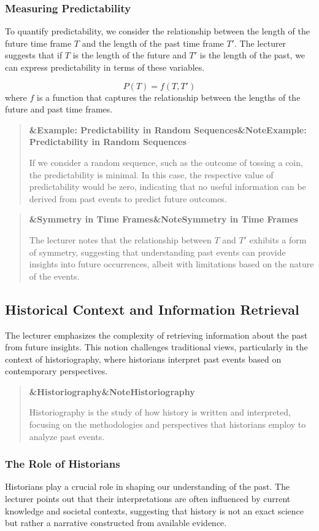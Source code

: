 \documentclass[a4paper]{article}
\newcommand{\boxheading}[1]{%
  \par\smallskip
  \noindent\textbf{\ifx&#1&Note\else#1\fi}\par
  \smallskip
}
\newenvironment{defbox}[1][]{%
  \begin{quote}\color{green!40!black}\boxheading{#1}\normalcolor
}{\end{quote}}
\newenvironment{exbox}[1][]{%
  \begin{quote}\color{brown!70!black}\boxheading{#1}\normalcolor
}{\end{quote}}
\newenvironment{rembox}[1][]{%
  \begin{quote}\color{black!70}\boxheading{#1}\normalcolor
}{\end{quote}}
\begin{document}
\subsubsection{Measuring Predictability}
To quantify predictability, we consider the relationship between the length of the future time frame \( T \) and the length of the past time frame \( T' \). The lecturer suggests that if \( T \) is the length of the future and \( T' \) is the length of the past, we can express predictability in terms of these variables.

\begin{equation}
P(T) = f(T, T')
\end{equation}
where \( f \) is a function that captures the relationship between the lengths of the future and past time frames.

\begin{exbox}[Example: Predictability in Random Sequences]
If we consider a random sequence, such as the outcome of tossing a coin, the predictability is minimal. In this case, the respective value of predictability would be zero, indicating that no useful information can be derived from past events to predict future outcomes.
\end{exbox}

\begin{rembox}[Symmetry in Time Frames]
The lecturer notes that the relationship between \( T \) and \( T' \) exhibits a form of symmetry, suggesting that understanding past events can provide insights into future occurrences, albeit with limitations based on the nature of the events.
\end{rembox}

\subsection{Historical Context and Information Retrieval}
The lecturer emphasizes the complexity of retrieving information about the past from future insights. This notion challenges traditional views, particularly in the context of historiography, where historians interpret past events based on contemporary perspectives.

\begin{defbox}[Historiography]
Historiography is the study of how history is written and interpreted, focusing on the methodologies and perspectives that historians employ to analyze past events.
\end{defbox}

\subsubsection{The Role of Historians}
Historians play a crucial role in shaping our understanding of the past. The lecturer points out that their interpretations are often influenced by current knowledge and societal contexts, suggesting that history is not an exact science but rather a narrative constructed from available evidence.
\end{document}
